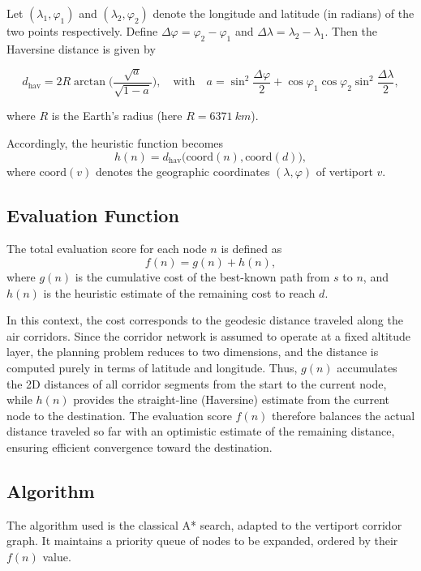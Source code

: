 Let $(\lambda_1,\varphi_1)$ and $(\lambda_2,\varphi_2)$ denote the longitude and
latitude (in radians) of the two points respectively. Define
$\Delta\varphi = \varphi_2 - \varphi_1$ and
$\Delta\lambda = \lambda_2 - \lambda_1$. Then the Haversine distance is given by

\begin{equation}
  d_\text{hav} = 2 R \arctan\!\Bigg(
  \frac{\sqrt{a}}{\sqrt{1-a}}\Bigg),
  \quad\text{with}\quad
  a = \sin^2\!\frac{\Delta\varphi}{2}
    + \cos\varphi_1 \cos\varphi_2
      \sin^2\!\frac{\Delta\lambda}{2},
\end{equation}

where $R$ is the Earth’s radius (here $R=\SI{6371}{km}$).

Accordingly, the heuristic function becomes
\begin{equation}
  h(n) = d_\text{hav}\big(\text{coord}(n), \text{coord}(d)\big),
\end{equation}
where $\text{coord}(v)$ denotes the geographic coordinates
$(\lambda,\varphi)$ of vertiport $v$.


\subsection*{Evaluation Function}
The total evaluation score for each node $n$ is defined as
\begin{equation}
    f(n) = g(n) + h(n),
\end{equation}
where $g(n)$ is the cumulative cost of the best-known path from $s$ to $n$, and
$h(n)$ is the heuristic estimate of the remaining cost to reach $d$.

In this context, the cost corresponds to the geodesic distance traveled along
the air corridors. Since the corridor network is assumed to operate at a fixed
altitude layer, the planning problem reduces to two dimensions, and the distance
is computed purely in terms of latitude and longitude. Thus, $g(n)$ accumulates
the 2D distances of all corridor segments from the start to the current node,
while $h(n)$ provides the straight-line (Haversine) estimate from the current
node to the destination. The evaluation score $f(n)$ therefore balances the actual
distance traveled so far with an optimistic estimate of the remaining distance,
ensuring efficient convergence toward the destination.

\subsection*{Algorithm}
The algorithm used is the classical A* search, adapted to the vertiport
corridor graph. It maintains a priority queue of nodes to be expanded,
ordered by their $f(n)$ value.

